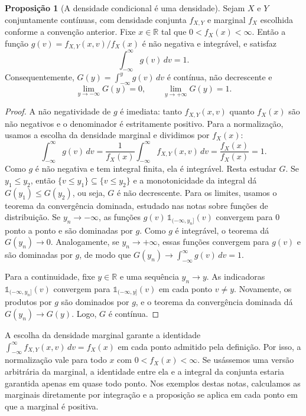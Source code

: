 \documentclass[12pt,portuguese]{article}
\theoremstyle{definition}
\newtheorem{proposition}[proposition]{Proposição}
\theoremstyle{plainexercise}
\theoremstyle{starredexercise}
\theoremstyle{definition}
\begin{document}
\begin{proposition}[A densidade condicional é uma densidade]\label{prop:verificacao-densidade}
  Sejam $X$ e $Y$ conjuntamente contínuas, com densidade conjunta $f_{X,Y}$ e
  marginal $f_X$ escolhida conforme a convenção anterior.
  Fixe $x \in \mathbb{R}$ tal que $0<f_X(x)<\infty$. Então a função
  $g(v) = f_{X,Y}(x,v)/f_X(x)$ é não negativa e integrável, e satisfaz
  \[
    \int_{-\infty}^{\infty} g(v)\,dv = 1.
  \]
  Consequentemente, $G(y) = \int_{-\infty}^{y} g(v)\,dv$ é contínua, não decrescente e
  \[
    \lim_{y \to -\infty} G(y) = 0, \qquad \lim_{y \to +\infty} G(y) = 1.
  \]
\end{proposition}

\begin{proof}
  A não negatividade de $g$ é imediata: tanto $f_{X,Y}(x,v)$ quanto $f_X(x)$ são não
  negativos e o denominador é estritamente positivo. Para a normalização, usamos a
  escolha da densidade marginal e dividimos por $f_X(x)$:
  \[
    \int_{-\infty}^{\infty} g(v)\,dv
    = \frac{1}{f_X(x)} \int_{-\infty}^{\infty} f_{X,Y}(x,v)\,dv
    = \frac{f_X(x)}{f_X(x)} = 1.
  \]
  Como $g$ é não negativa e tem integral finita, ela é integrável. Resta estudar $G$. Se
  $y_1 \leqslant y_2$, então $\{v \leqslant y_1\} \subseteq \{v \leqslant y_2\}$ e a
  monotonicidade da integral dá $G(y_1) \leqslant G(y_2)$, ou seja, $G$ é não decrescente.
  Para os limites, usamos o teorema da convergência dominada, estudado nas notas sobre
  funções de distribuição. Se $y_n \to -\infty$, as funções
  $g(v)\,\mathds{1}_{(-\infty,y_n]}(v)$ convergem para $0$ ponto a ponto e são dominadas por
  $g$. Como $g$ é integrável, o teorema dá $G(y_n) \to 0$.
  Analogamente, se $y_n \to +\infty$, essas funções convergem para $g(v)$ e são
  dominadas por $g$, de modo que $G(y_n) \to \int_{-\infty}^{\infty} g(v)\,dv = 1$.

  Para a continuidade, fixe $y\in\mathbb{R}$ e uma sequência $y_n\to y$.
  As indicadoras $\mathds{1}_{(-\infty,y_n]}(v)$ convergem para
  $\mathds{1}_{(-\infty,y]}(v)$ em cada ponto $v\neq y$.
  Novamente, os produtos por $g$ são dominados por $g$, e o teorema da convergência
  dominada dá $G(y_n)\to G(y)$. Logo, $G$ é contínua.
\end{proof}

A escolha da densidade marginal garante a identidade
$\int_{-\infty}^{\infty} f_{X,Y}(x,v)\,dv=f_X(x)$ em cada ponto admitido
pela definição. Por isso, a normalização vale para todo $x$ com
$0<f_X(x)<\infty$.
Se usássemos uma versão arbitrária da marginal, a identidade entre ela e a
integral da conjunta estaria garantida apenas em quase todo ponto.
Nos exemplos destas notas, calculamos as marginais diretamente por integração
e a proposição se aplica em cada ponto em que a marginal é positiva.
\end{document}
